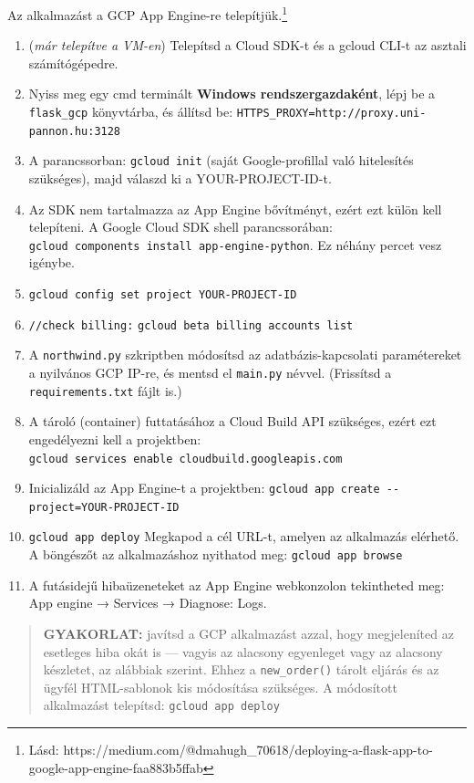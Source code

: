 \documentclass[
  magyar,
]{article}
\begin{document}
Az alkalmazást a GCP App Engine-re telepítjük.\footnote{Lásd:
  https://medium.com/@dmahugh\_70618/deploying-a-flask-app-to-google-app-engine-faa883b5ffab}

\begin{enumerate}
\def\labelenumi{\arabic{enumi}.}
\item
  (\emph{már telepítve a VM-en}) Telepítsd a Cloud SDK-t és a gcloud
  CLI-t az asztali számítógépedre.
\item
  Nyiss meg egy cmd terminált \textbf{Windows rendszergazdaként}, lépj
  be a \texttt{flask\_gcp} könyvtárba, és állítsd be:
  \texttt{HTTPS\_PROXY=http://proxy.uni-pannon.hu:3128}
\item
  A parancssorban: \texttt{gcloud\ init} (saját Google-profillal való
  hitelesítés szükséges), majd válaszd ki a YOUR-PROJECT-ID-t.
\item
  Az SDK nem tartalmazza az App Engine bővítményt, ezért ezt külön kell
  telepíteni. A Google Cloud SDK shell parancssorában:
  \texttt{gcloud\ components\ install\ app-engine-python}. Ez néhány
  percet vesz igénybe.
\item
  \texttt{gcloud\ config\ set\ project\ YOUR-PROJECT-ID}
\item
  \texttt{//check\ billing:}
  \texttt{gcloud\ beta\ billing\ accounts\ list}
\item
  A \texttt{northwind.py} szkriptben módosítsd az adatbázis-kapcsolati
  paramétereket a nyilvános GCP IP-re, és mentsd el \texttt{main.py}
  névvel. (Frissítsd a \texttt{requirements.txt} fájlt is.)
\item
  A tároló (container) futtatásához a Cloud Build API szükséges, ezért
  ezt engedélyezni kell a projektben:
  \texttt{gcloud\ services\ enable\ cloudbuild.googleapis.com}
\item
  Inicializáld az App Engine-t a projektben:
  \texttt{gcloud\ app\ create\ -\/-project=YOUR-PROJECT-ID}
\item
  \texttt{gcloud\ app\ deploy} Megkapod a cél URL-t, amelyen az
  alkalmazás elérhető. A böngészőt az alkalmazáshoz nyithatod meg:
  \texttt{gcloud\ app\ browse}
\item
  A futásidejű hibaüzeneteket az App Engine webkonzolon tekintheted meg:
  App engine → Services → Diagnose: Logs.
\end{enumerate}

\begin{quote}
\textbf{GYAKORLAT:} javítsd a GCP alkalmazást azzal, hogy megjeleníted
az esetleges hiba okát is --- vagyis az alacsony egyenleget vagy az
alacsony készletet, az alábbiak szerint. Ehhez a \texttt{new\_order()}
tárolt eljárás és az ügyfél HTML-sablonok kis módosítása szükséges. A
módosított alkalmazást telepítsd: \texttt{gcloud\ app\ deploy}
\end{quote}
\end{document}
